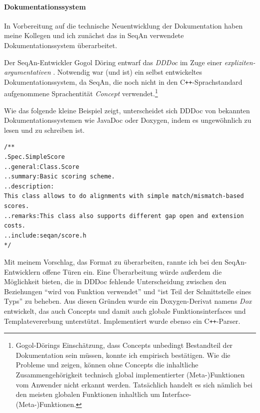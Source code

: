 \paragraph{Dokumentationssystem}

In Vorbereitung auf die technische Neuentwicklung der Dokumentation haben meine Kollegen und ich zunächst das in SeqAn verwendete Dokumentationssystem überarbeitet.

Der SeqAn-Entwickler Gogol Döring entwarf das  \textit{DDDoc} im Zuge einer \textit{expliziten-argumentativen} . Notwendig war (und ist) ein selbst entwickeltes Dokumentationssystem, da SeqAn, die noch nicht in den C\texttt{++}-Sprachstandard aufgenommene Sprachentität \textit{Concept} verwendet.\footnote{Gogol-Dörings Einschätzung, dass Concepts unbedingt Bestandteil der Dokumentation sein müssen, konnte ich empirisch bestätigen. Wie die Probleme  und  zeigen, können ohne Concepts die inhaltliche Zusammengehörigkeit technisch global implementierter \mbox{(Meta-)Funktionen} vom Anwender nicht erkannt werden. Tatsächlich handelt es sich nämlich bei den meisten globalen Funktionen inhaltlich um \mbox{Interface-(Meta-)Funktionen.}}

Wie das folgende kleine Beispiel zeigt, unterscheidet sich DDDoc von bekannten Dokumentationssystemen wie JavaDoc oder Doxygen, indem es ungewöhnlich zu lesen und zu schreiben ist.

\begin{center}
\begin{verbatim}
/**
.Spec.SimpleScore
..general:Class.Score
..summary:Basic scoring scheme.
..description:
This class allows to do alignments with simple match/mismatch-based scores.
..remarks:This class also supports different gap open and extension costs.
..include:seqan/score.h
*/
\end{verbatim}
\label{lst:dddoc}
\end{center}

\bigskip

Mit meinem Vorschlag, das Format zu überarbeiten, rannte ich bei den SeqAn-Entwicklern offene Türen ein. Eine Überarbeitung würde außerdem die Möglichkeit bieten, die in DDDoc fehlende Unterscheidung zwischen den Beziehungen ``wird von Funktion verwendet'' und ``ist Teil der Schnittstelle eines Typs'' zu beheben. Aus diesen Gründen wurde ein Doxygen-Derivat namens \textit{Dox} entwickelt, das auch Concepts und damit auch globale Funktionsinterfaces und Templatevererbung unterstützt. Implementiert wurde ebenso ein C{}\verb!++!-Parser.

